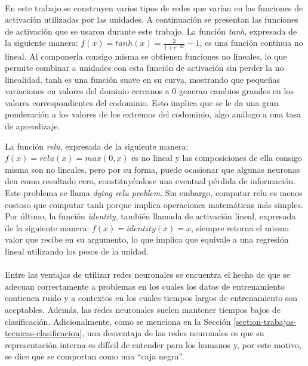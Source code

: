 \paragraph{}En este trabajo se construyen varios tipos de redes que varían en las funciones de activación utilizadas por las unidades.
A continuación se presentan las funciones de activación que se usaron durante este trabajo. 
La función \textit{tanh}, expresada de la siguiente manera: $f(x) = tanh(x) = \frac{2}{1 + e^{-2x}} - 1 $, es una función continua no lineal.
Al componerla consigo misma se obtienen funciones no lineales, lo que permite combinar a unidades con esta función de activación sin perder la no linealidad. 
tanh es una función suave en su curva, mostrando que pequeñas variaciones en valores del dominio cercanos a 0 generan cambios grandes en los valores correspondientes del codominio.
Esto implica que se le da una gran ponderación a los valores de los extremos del codominio, algo análogo a una tasa de aprendizaje. 

La función \textit{relu}, expresada de la siguiente manera: $f(x) = relu(x) = max(0, x)$ es no lineal y las composiciones de ella consigo misma son no lineales, pero por su forma, puede ocasionar que algunas neuronas den como resultado cero, constituyéndose una eventual pérdida de información.
Este problema se llama \textit{dying relu problem}.
Sin embargo, computar relu es menos costoso que computar tanh porque implica operaciones matemáticas más simples.
Por último, la función \textit{identity}, también llamada de activación lineal, expresada de la siguiente manera: $f(x) = identity(x) = x$, siempre retorna el mismo valor que recibe en su argumento, lo que implica que equivale a una regresión lineal utilizando los pesos de la unidad.

\paragraph{}Entre las ventajas de utilizar redes neuronales se encuentra el hecho de que se adecuan correctamente a problemas en los cuales los datos de entrenamiento contienen ruido y a contextos en los cuales tiempos largos de entrenamiento son aceptables.
Además, las redes neuronales suelen mantener tiempos bajos de clasificación.
Adicionalmente, como se menciona en la Sección \ref{section-trabajos-tecnicas-clasificacion}, una desventaja de las redes neuronales es que su representación interna es difícil de entender para los humanos y, por este motivo, se dice que se comportan como una “caja negra”.